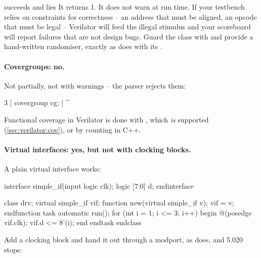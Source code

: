 \begin{gotcha}{ succeeds and lies}
It returns 1. It does not warn at run time. If your testbench relies on
constraints for correctness -- an address that must be aligned, an opcode that
must be legal -- Verilator will feed the \DUT{} illegal stimulus and your
scoreboard will report failures that are not design bugs. Guard the class with
 and provide a hand-written randomiser, exactly as
 does with its .
\end{gotcha}

\paragraph{Covergroups: no.} Not partially, not with warnings -- the parser
rejects them:

\begin{txtcode}
    3 |   covergroup cg;
      |   ^~~~~~~~~~
\end{txtcode}

Functional coverage in Verilator is done with , which
\emph{is} supported (\cref{sec:verilator:cov}), or by counting in C++.

\paragraph{Virtual interfaces: yes, but not with clocking blocks.} A plain
virtual interface works:

\begin{svcode}[caption={A virtual interface driven from a class},label={lst:verilator:vif}]
interface simple_if(input logic clk);
  logic [7:0] d;
endinterface

class drv;
  virtual simple_if vif;
  function new(virtual simple_if v); vif = v; endfunction
  task automatic run();
    for (int i = 1; i <= 3; i++) begin
      @(posedge vif.clk);
      vif.d <= 8'(i);
    end
  endtask
endclass
\end{svcode}


Add a clocking block and hand it out through a modport, as
 does, and 5.020 stops:

